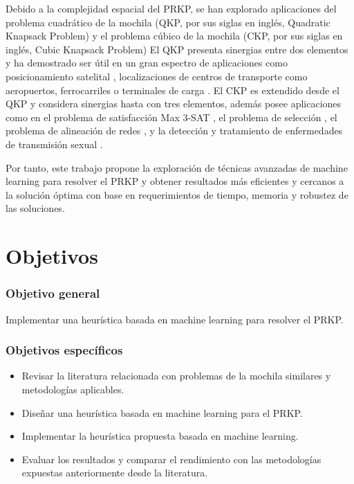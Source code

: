 \documentclass[spanish, a4paper, 12pt, twoside, openany,final]{book}
\numberwithin{equation}{section}
\begin{document}
Debido a la complejidad espacial del PRKP, se han explorado aplicaciones del problema cuadrático de la mochila (QKP, por sus siglas en inglés, Quadratic Knapsack Problem) \citep{gallo_quadratic_1980} y el problema cúbico de la mochila (CKP, por sus siglas en inglés, Cubic Knapsack Problem) \citep{forrester_strengthening_2022} El QKP presenta sinergias entre dos elementos y ha demostrado ser útil en un gran espectro de aplicaciones como posicionamiento satelital \citep{witzgall_mathematical_1975}, localizaciones de centros de transporte como aeropuertos, ferrocarriles o terminales de carga \citep{rhys_selection_1970}. El CKP es extendido desde el QKP y considera sinergias hasta con tres elementos, además posee aplicaciones como en el problema de satisfacción Max 3-SAT \citep{kofler_penalty_2014}, el problema de selección \citep{gallo_fast_1989}, el problema de alineación de redes \citep{mohammadi_triangular_2017}, y la detección y tratamiento de enfermedades de transmisión sexual \citep{zhao_treatments_2008}.

Por tanto, este trabajo propone la exploración de técnicas avanzadas de machine learning para resolver el PRKP y obtener resultados más eficientes y cercanos a la solución óptima con base en requerimientos de tiempo, memoria y robustez de las soluciones.

\section{Objetivos}
\subsubsection*{Objetivo general}
Implementar una heurística basada en machine learning para resolver el PRKP.
\subsubsection*{Objetivos específicos}
\begin{itemize}
	\item Revisar la literatura relacionada con problemas de la mochila similares y metodologías aplicables.
	\item Diseñar una heurística basada en machine learning para el PRKP.
	\item Implementar la heurística propuesta basada en machine learning.
	\item Evaluar los resultados y comparar el rendimiento con las metodologías expuestas anteriormente desde la literatura.
\end{itemize}
\end{document}
